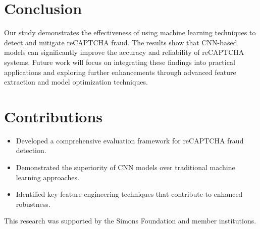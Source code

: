 \documentclass{article}
\begin{document}
\section{Conclusion}
\label{sec:conclusion}
Our study demonstrates the effectiveness of using machine learning techniques to detect and mitigate reCAPTCHA fraud. The results show that CNN-based models can significantly improve the accuracy and reliability of reCAPTCHA systems. Future work will focus on integrating these findings into practical applications and exploring further enhancements through advanced feature extraction and model optimization techniques.

\section{Contributions}
\begin{itemize}
    \item Developed a comprehensive evaluation framework for reCAPTCHA fraud detection.
    \item Demonstrated the superiority of CNN models over traditional machine learning approaches.
    \item Identified key feature engineering techniques that contribute to enhanced robustness.
\end{itemize}

\acks
This research was supported by the Simons Foundation and member institutions.



\end{document}
